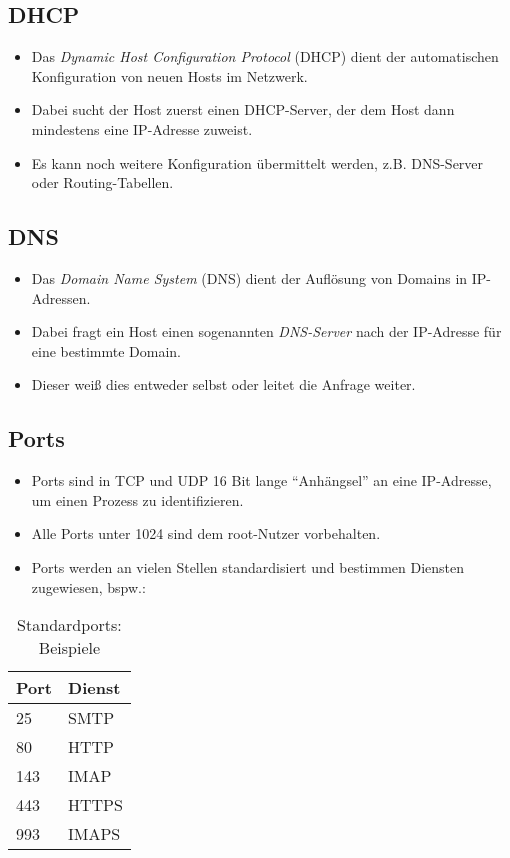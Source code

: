         \subsection{DHCP}
            \begin{itemize}
            	\item Das \textit{Dynamic Host Configuration Protocol} (DHCP) dient der automatischen Konfiguration von neuen Hosts im Netzwerk.
            	\item Dabei sucht der Host zuerst einen DHCP-Server, der dem Host dann mindestens eine IP-Adresse zuweist.
            	\item Es kann noch weitere Konfiguration übermittelt werden, z.B. DNS-Server oder Routing-Tabellen.
            \end{itemize}

        \subsection{DNS}
            \begin{itemize}
            	\item Das \textit{Domain Name System} (DNS) dient der Auflösung von Domains in IP-Adressen.
            	\item Dabei fragt ein Host einen sogenannten \textit{DNS-Server} nach der IP-Adresse für eine bestimmte Domain.
            	\item Dieser weiß dies entweder selbst oder leitet die Anfrage weiter.
            \end{itemize}

        \subsection{Ports}
            \begin{itemize}
            	\item Ports sind in TCP und UDP 16 Bit lange \enquote{Anhängsel} an eine IP-Adresse, um einen Prozess zu identifizieren.
            	\item Alle Ports unter 1024 sind dem root-Nutzer vorbehalten.
            	\item Ports werden an vielen Stellen standardisiert und bestimmen Diensten zugewiesen, bspw.:
            \end{itemize}
			\begin{table}[H]
				\centering
				\begin{tabular}{l | l}
					\textbf{Port} & \textbf{Dienst} \\ \hline
					25            & SMTP            \\
					80            & HTTP            \\
					143           & IMAP            \\
					443           & HTTPS           \\
					993           & IMAPS
				\end{tabular}
				\caption{Standardports: Beispiele}
			\end{table}

